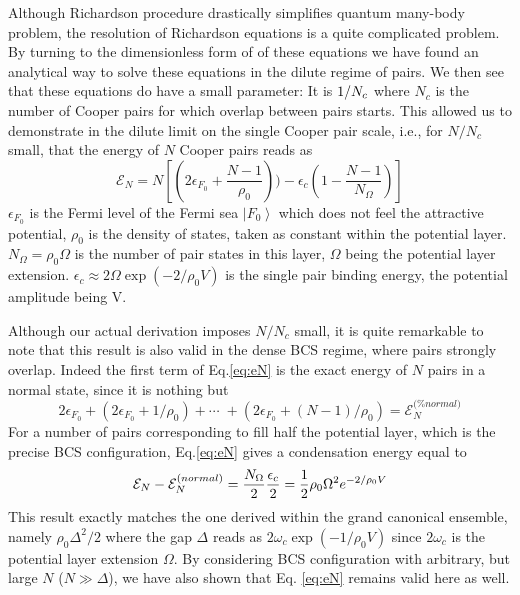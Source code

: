 \documentclass[aps,prb,superscriptaddress,twocolumn]{revtex4}
\begin{document}
Although Richardson procedure drastically simplifies quantum many-body
problem, the resolution of Richardson equations is a quite complicated
problem. By turning to the dimensionless form of of these equations we have
found an analytical way to solve these equations in the dilute regime of
pairs. We then see that these equations do have a small parameter: It is $1/{%
N_{c}}$ where $N_{c}$ is the number of Cooper pairs for which overlap
between pairs starts. This allowed us to demonstrate in the dilute limit on
the single Cooper pair scale, i.e., for $N/N_{c}$ small, that the energy of $%
N$ Cooper pairs reads as 
\begin{equation}
\mathcal{E}_{N}=N\left[ \left( 2\epsilon _{F_{0}}+\frac{N-1}{\rho _{0}}%
\right) )-\epsilon _{c}\left( 1-\frac{N-1}{N_{\Omega }}\right) \right]
\label{eq:eN}
\end{equation}%
$\epsilon _{F_{0}}$ is the Fermi level of the Fermi sea $\left\vert
F_{0}\right\rangle $ which does not feel the attractive potential, $\rho
_{0} $ is the density of states, taken as constant within the potential
layer. $N_{\Omega }=\rho _{0}\Omega $ is the number of pair states in this
layer, $\Omega $ being the potential layer extension. $\epsilon _{c}\approx
2\Omega \exp \left( -2/\rho _{0}V\right) $ is the single pair binding
energy, the potential amplitude being V.

Although our actual derivation imposes $N/N_{c}$ small, it is quite
remarkable to note that this result is also valid in the dense BCS regime,
where pairs strongly overlap. Indeed the first term of Eq.\eqref{eq:eN} is
the exact energy of $N$ pairs in a normal state, since it is nothing but 
\begin{equation}
2\epsilon _{F_{0}}+\left( 2\epsilon _{F_{0}}+1/\rho _{0}\right) +\cdots
\;+\left( 2\epsilon _{F_{0}}+(N-1)/\rho _{0}\right) =\mathcal{E}_{N}^{\text{(%
}normal)}
\end{equation}%
For a number of pairs corresponding to fill half the potential layer, which
is the precise BCS configuration, Eq.\eqref{eq:eN} gives a condensation
energy equal to 
\begin{equation}
\mathcal{E}_{N}-\mathcal{E}_{N}^{\text{(}normal)}=\frac{N_{\Omega }}{2}\frac{%
\epsilon _{c}}{2}=\frac{1}{2}\rho _{0}\Omega ^{2}e^{-2/\rho _{0}V}
\end{equation}%
This result exactly matches the one derived within the grand canonical
ensemble, namely $\rho _{0}\Delta ^{2}/2$ where the gap $\Delta $ reads as $%
2\omega _{c}\exp \left( -1/\rho _{0}V\right) $ since $2\omega _{c}$ is the
potential layer extension $\Omega $. By considering BCS configuration with
arbitrary, but large $N$ ($N\gg \Delta $), we have also shown that Eq.%
\eqref{eq:eN} remains valid here as well.
\end{document}
